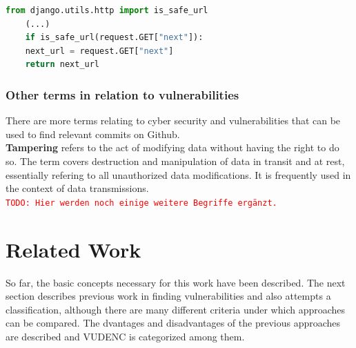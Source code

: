 \documentclass[
a4paper,
pagesize,
pdftex,
12pt,
twoside, %
BCOR=5mm, %
ngerman,
fleqn,
final,
]{scrartcl}
\begin{document}
	\begin{lstlisting}[language=Python, showstringspaces=False]
	from django.utils.http import is_safe_url
	(...)
	if is_safe_url(request.GET["next"]):
	next_url = request.GET["next"]
	return next_url
	\end{lstlisting}
	
	
	\subsubsection{Other terms in relation to vulnerabilities}
	There are more terms relating to cyber security and vulnerabilities that can be used to find relevant commits on Github.\\
	\textbf{Tampering} refers to the act of modifying data without having the right to do so. The term covers destruction and manipulation of data in transit and at rest, essentially refering to all unauthorized data modifications. It is frequently used in the context of data transmissions.\\
	
	
	\textcolor{red}{\texttt{TODO: Hier werden noch einige weitere Begriffe ergänzt.}}
	
	\newpage
	\section{Related Work}\label{Related-Work}
	
	So far, the basic concepts necessary for this work have been described. The next section describes previous work in finding vulnerabilities and also attempts a classification, although there are many different criteria under which approaches can be compared. The dvantages and disadvantages of the previous approaches are described and VUDENC is categorized among them.
	
\end{document}
